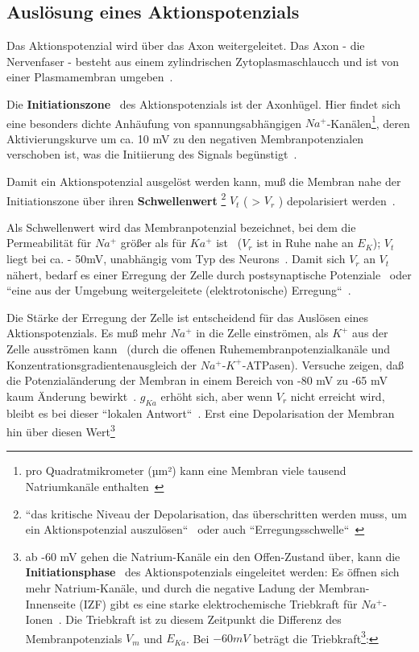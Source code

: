 {{\subsection{Auslösung eines Aktionspotenzials}

Das Aktionspotenzial wird über das Axon weitergeleitet. Das Axon - die Nervenfaser - besteht aus einem zylindrischen Zytoplasmaschlaucch und ist von einer Plasmamembran umgeben~\cite[73]{Jon19}.

Die \textbf{Initiationszone}~\cite[111]{BCP18} des Aktionspotenzials ist der Axonhügel. Hier findet sich eine besonders dichte Anhäufung von spannungsabhängigen $Na^+$-Kanälen\footnote{
 pro Quadratmikrometer (µm²) kann eine Membran viele tausend Natriumkanäle enthalten~\cite[99]{BCP18}
}, deren Aktivierungskurve um ca. 10 mV zu den negativen Membranpotenzialen verschoben ist, was die Initiierung des Signals begünstigt~\cite[77]{Jon19}.

Damit ein Aktionspotenzial ausgelöst werden kann, muß die Membran nahe der Initiationszone über ihren \textbf{Schwellenwert} \footnote{
 ``das kritische Niveau der Depolarisation, das überschritten werden muss, um ein Aktionspotenzial auszulösen``~\cite[88]{BCP18} oder auch ``Erregungsschwelle``~\cite[69]{FE19}
} $V_t$ ( > $V_r$ ) depolarisiert werden~\cite[111]{BCP18}.


 Als Schwellenwert wird das Membranpotenzial bezeichnet, bei dem die Permeabilität für $Na^+$ größer als für $Ka^+$ ist~\cite[103]{BCP18} ($V_r$ ist in Ruhe nahe an $E_K$); $V_t$ liegt bei ca. - 50mV, unabhängig vom Typ des Neurons~\cite[75]{Jon19}.
 Damit sich $V_r$ an $V_t$ nähert, bedarf es einer Erregung der Zelle durch postsynaptische Potenziale~\cite[69]{FE19} oder ``eine aus der Umgebung weitergeleitete (elektrotonische) Erregung``~\cite[46]{SD07}.

Die Stärke der Erregung der Zelle ist entscheidend für das Auslösen eines Aktionspotenzials. Es muß mehr $Na^+$ in die Zelle einströmen, als $K^+$ aus der Zelle ausströmen kann~\cite[69]{FE19} (durch die offenen Ruhemembranpotenzialkanäle und Konzentrationsgradientenausgleich der $Na^+$-$K^+$-ATPasen).
Versuche zeigen, daß die Potenzialänderung der Membran in einem Bereich von -80 mV zu -65 mV kaum Änderung bewirkt~\cite[99]{BCP18}. $g_{Ka}$ erhöht sich, aber wenn $V_r$ nicht erreicht wird, bleibt es bei dieser ``lokalen Antwort``~\cite[46]{SD07}. Erst eine Depolarisation der Membran hin über diesen Wert\footnote{ab -60 mV gehen die Natrium-Kanäle ein den Offen-Zustand über\cite[69]{FE19}, kann die \textbf{Initiationsphase}~\cite[68]{FE19} des Aktionspotenzials eingeleitet werden: Es öffnen sich mehr Natrium-Kanäle, und durch die negative Ladung der Membran-Innenseite (IZF) gibt es eine starke elektrochemische Triebkraft für $Na^+$-Ionen~\cite[103]{BCP18}. Die Triebkraft ist zu diesem Zeitpunkt die Differenz des Membranpotenzials $V_m$ und $E_{Ka}$. Bei $-60 mV$ beträgt die Triebkraft\footnote{
 vgl.~\cite[39]{Fak19}
}:

}}}
